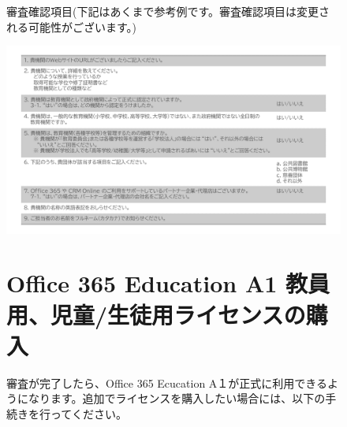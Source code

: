 \begin{figure}[h]
    \begin{minipage}{1.0\textwidth}
        審査確認項目(下記はあくまで参考例です。審査確認項目は変更される可能性がございます。)
    \end{minipage}
\end{figure}

\begin{figure}[h]
    \centering
    \includegraphics[width=17cm]{figures/O365A1_review01.png}
    \vspace{6cm}
\end{figure}

\begin{figure}[h]
    \begin{minipage}{1.0\textwidth}
        \section{Office 365 Education A1 教員用、児童/生徒用ライセンスの購入}
        \label{sec:Office365ライセンス購入}
        審査が完了したら、Office 365 Ecucation A１が正式に利用できるようになります。追加でライセンスを購入したい場合には、以下の手続きを行ってください。
    \end{minipage}
\end{figure}

